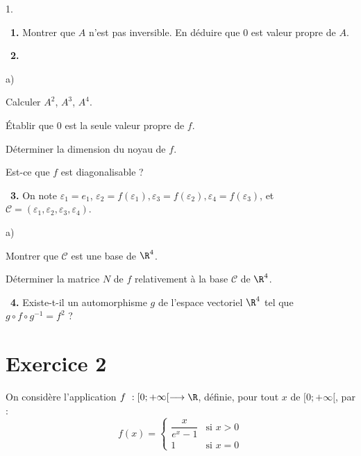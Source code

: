 \documentclass[11pt]{article}%
\begin{document}
\begin{noliste}{1.}
 \setlength{\itemsep}{4mm}
\item[ \ \textbf{1.}] Montrer que $A$ n'est pas inversible. En déduire
que $0$
est valeur propre de $A$.

\item[ \ \textbf{2.}]

\begin{noliste}{a)}
 \setlength{\itemsep}{2mm}
\item Calculer $A^{2}$, $A^{3}$, $A^{4}$.

\item Établir que $0$ est la seule valeur propre de $f$.

\item Déterminer la dimension du noyau de $f$.

\item Est-ce que $f$ est diagonalisable ?
\end{noliste}

\item[ \ \textbf{3.}] On note $\varepsilon_{1} = e_{1}$, $\varepsilon
_{2} = f(\varepsilon_{1}),\varepsilon_{3} =
f(\varepsilon_{2}),\varepsilon
_{4} = f(\varepsilon_{3})$, et $\mathcal{C} =
(\varepsilon_{1},\varepsilon
_{2},\varepsilon_{3},\varepsilon_{4})$.

\begin{noliste}{a)}
 \setlength{\itemsep}{2mm}
\item Montrer que $\mathcal{C}$ est une base de $\R^{4}$.

\item Déterminer la matrice $N$ de $f$ relativement à la base
$\mathcal{C}$
de $\R^{4}$.
\end{noliste}

\item[ \ \textbf{4.}] Existe-t-il un automorphisme $g$ de l'espace
vectoriel $\R^{4}$ tel que $g\circ f\circ g^{-1} = f^{2}$ ?
\end{noliste}

\section*{Exercice 2}

\noindent On considère l'application $f\ :[0; + \infty \lbrack
\longrightarrow
\R$, définie, pour tout $x$ de $[0; + \infty \lbrack $, par :
\[
f(x) = \left\{
\begin{array}{cl}
\dfrac{x}{e^{x}-1} & \text{si }x>0 \\
1 & \text{si }x = 0
\end{array}
\right.
\]
\end{document}
